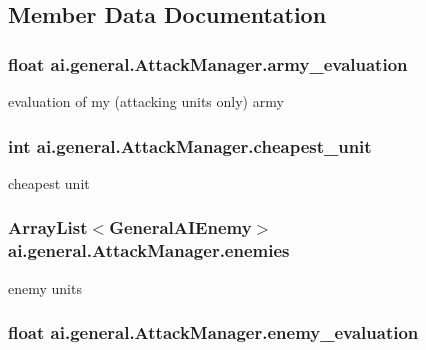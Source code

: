 \subsection{Member Data Documentation}
\hypertarget{classai_1_1general_1_1_attack_manager_ad41874870bb278b128ce86d454b88335}{
\subsubsection[{army\_\-evaluation}]{\setlength{\rightskip}{0pt plus 5cm}float {\bf ai.general.AttackManager.army\_\-evaluation}}}
\label{classai_1_1general_1_1_attack_manager_ad41874870bb278b128ce86d454b88335}
evaluation of my (attacking units only) army \hypertarget{classai_1_1general_1_1_attack_manager_afdc4a2a128fad3668c8574c08a68a095}{
\subsubsection[{cheapest\_\-unit}]{\setlength{\rightskip}{0pt plus 5cm}int {\bf ai.general.AttackManager.cheapest\_\-unit}}}
\label{classai_1_1general_1_1_attack_manager_afdc4a2a128fad3668c8574c08a68a095}
cheapest unit \hypertarget{classai_1_1general_1_1_attack_manager_a53d8def4a0c0dfc670b1b6b48dc2f672}{
\subsubsection[{enemies}]{\setlength{\rightskip}{0pt plus 5cm}ArrayList$<${\bf GeneralAIEnemy}$>$ {\bf ai.general.AttackManager.enemies}}}
\label{classai_1_1general_1_1_attack_manager_a53d8def4a0c0dfc670b1b6b48dc2f672}
enemy units \hypertarget{classai_1_1general_1_1_attack_manager_aab9e1ce511b6c0764d792ab3c2103785}{
\subsubsection[{enemy\_\-evaluation}]{\setlength{\rightskip}{0pt plus 5cm}float {\bf ai.general.AttackManager.enemy\_\-evaluation}}}
